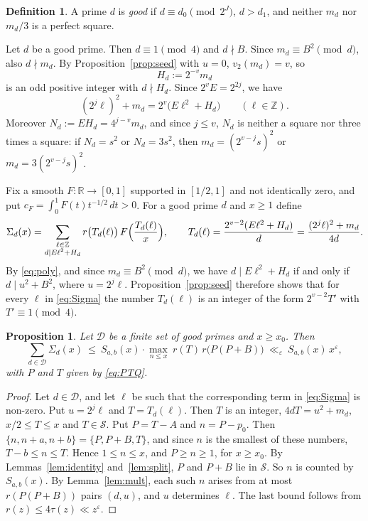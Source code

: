 \documentclass[11pt]{amsart}
\newtheorem{proposition}[theorem]{Proposition}
\theoremstyle{remark}
\theoremstyle{definition}
\newtheorem{definition}[theorem]{Definition}
\numberwithin{equation}{section}
\newcommand{\Sc}{\mathcal{S}}
\newcommand{\Dc}{\mathcal{D}}
\newcommand{\Z}{\mathbb{Z}}
\newcommand{\R}{\mathbb{R}}
\newcommand{\eps}{\varepsilon}
\begin{document}
\begin{definition}
A prime $d$ is \emph{good} if $d\equiv d_0\pmod{2^J}$, $d>d_1$, and neither $m_d$ nor $m_d/3$ is a perfect square.
\end{definition}

Let $d$ be a good prime. Then $d\equiv1\pmod4$ and $d\nmid B$. Since $m_d\equiv B^2\pmod d$, also $d\nmid m_d$. By Proposition~\ref{prop:seed} with $u=0$, $v_2(m_d)=v$, so
\[
H_d:=2^{-v}m_d
\]
is an odd positive integer with $d\nmid H_d$. Since $2^vE=2^{2j}$, we have
\begin{equation}\label{eq:poly}
(2^j\ell)^2+m_d=2^v\bigl(E\ell^2+H_d\bigr)\qquad(\ell\in\Z).
\end{equation}
Moreover $N_d:=EH_d=4^{j-v}m_d$, and since $j\le v$, $N_d$ is neither a square nor three times a square: if $N_d=s^2$ or $N_d=3s^2$, then $m_d=(2^{v-j}s)^2$ or $m_d=3(2^{v-j}s)^2$.

Fix a smooth $F:\R\to[0,1]$ supported in $[1/2,1]$ and not identically zero, and put $c_F=\int_0^1F(t)t^{-1/2}\,dt>0$. For a good prime $d$ and $x\ge1$ define
\begin{equation}\label{eq:Sigma}
\Sigma_d(x)=\sum_{\substack{\ell\in\Z\\ d\mid E\ell^2+H_d}}r\bigl(T_d(\ell)\bigr)\,F\Bigl(\frac{T_d(\ell)}x\Bigr),\qquad T_d(\ell)=\frac{2^{v-2}(E\ell^2+H_d)}{d}=\frac{(2^j\ell)^2+m_d}{4d}.
\end{equation}
By \eqref{eq:poly}, and since $m_d\equiv B^2\pmod d$, we have $d\mid E\ell^2+H_d$ if and only if $d\mid u^2+B^2$, where $u=2^j\ell$. Proposition~\ref{prop:seed} therefore shows that for every $\ell$ in \eqref{eq:Sigma} the number $T_d(\ell)$ is an integer of the form $2^{v-2}T'$ with $T'\equiv1\pmod 4$.

\begin{proposition}\label{prop:reduction}
Let $\Dc$ be a finite set of good primes and $x\ge x_0$. Then
\[
\sum_{d\in\Dc}\Sigma_d(x)\ \le\ S_{a,b}(x)\cdot\max_{n\le x}\ r(T)\,r\bigl(P(P+B)\bigr)\ \ll_\eps\ S_{a,b}(x)\,x^{\eps},
\]
with $P$ and $T$ given by \eqref{eq:PTQ}.
\end{proposition}

\begin{proof}
Let $d\in\Dc$, and let $\ell$ be such that the corresponding term in \eqref{eq:Sigma} is non-zero. Put $u=2^j\ell$ and $T=T_d(\ell)$. Then $T$ is an integer, $4dT=u^2+m_d$, $x/2\le T\le x$ and $T\in\Sc$. Put $P=T-A$ and $n=P-p_0$. Then $\{n,n+a,n+b\}=\{P,P+B,T\}$, and since $n$ is the smallest of these numbers, $T-b\le n\le T$. Hence $1\le n\le x$, and $P\ge n\ge1$, for $x\ge x_0$. By Lemmas~\ref{lem:identity} and~\ref{lem:split}, $P$ and $P+B$ lie in $\Sc$. So $n$ is counted by $S_{a,b}(x)$. By Lemma~\ref{lem:mult}, each such $n$ arises from at most $r(P(P+B))$ pairs $(d,u)$, and $u$ determines $\ell$. The last bound follows from $r(z)\le4\tau(z)\ll z^{\eps}$.
\end{proof}
\end{document}
